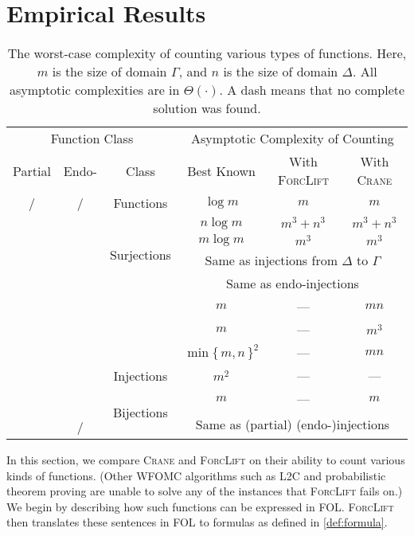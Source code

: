 \documentclass[letterpaper]{article} %
\newcommand{\cmark}{\ding{51}}%
\newcommand{\xmark}{\ding{55}}%
\theoremstyle{definition}
\begin{document}
\section{Empirical Results}\label{sec:results} %

\begin{table*}[t]
  \centering
  \begin{tabular}{cccccc}
    \toprule
    \multicolumn{3}{c}{Function Class} & \multicolumn{3}{c}{Asymptotic Complexity of Counting} \\
    Partial & Endo- & Class & Best Known & With \textsc{ForcLift} & With \textsc{Crane} \\
    \midrule
    \rowcolor{gray!10}\cmark/\xmark & \cmark/\xmark & Functions & $\log m$ & $m$ & $m$ \\
    \xmark & \xmark & \multirow{4}{*}{Surjections} & $n \log m$ & $m^{3}+n^{3}$ & $m^{3}+n^{3}$ \\
    \xmark & \cmark & & $m \log m$ & $m^{3}$ & $m^{3}$ \\
    \cmark & \xmark & & \multicolumn{3}{c}{Same as injections from $\Delta$ to $\Gamma$} \\
    \cmark & \cmark & & \multicolumn{3}{c}{Same as endo-injections} \\
    \rowcolor{gray!10}\xmark & \xmark & & $m$ & --- & $mn$ \\
    \rowcolor{gray!10}\xmark & \cmark & & $m$ & --- & $m^3$ \\
    \rowcolor{gray!10}\cmark & \xmark & & $\min\{\, m, n \,\}^2$ & --- & $mn$ \\
    \rowcolor{gray!10}\cmark & \cmark & \multirow{-4}{*}{Injections} & $m^2$ & --- & --- \\
    \xmark & \xmark & \multirow{3}{*}{Bijections} & $m$ & --- & $m$ \\
    \xmark & \cmark & & \multicolumn{3}{c}{\multirow{2}{*}{Same as (partial) (endo-)injections}} \\
    \cmark & \cmark/\xmark & & \multicolumn{3}{c}{} \\
    \bottomrule
  \end{tabular}
  \caption{The worst-case complexity of counting various types of functions.
    Here, $m$ is the size of domain $\Gamma$, and $n$ is the size of domain
    $\Delta$. All asymptotic complexities are in $\Theta(\cdot)$. A dash means
    that no complete solution was found.}\label{tbl:results}
\end{table*}

In this section, we compare \textsc{Crane} and \textsc{ForcLift}
\citep{DBLP:conf/ijcai/BroeckTMDR11} on their ability to count various kinds of
functions. (Other WFOMC algorithms such as \textsc{L2C}
\citep{DBLP:conf/kr/KazemiP16} and probabilistic theorem proving
\citep{DBLP:journals/cacm/GogateD16} are unable to solve any of the instances
that \textsc{ForcLift} fails on.) We begin by describing how such functions can
be expressed in FOL\@. \textsc{ForcLift} then translates these sentences in FOL
to formulas as defined in \cref{def:formula}.
\end{document}
